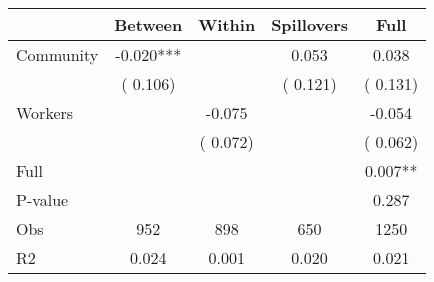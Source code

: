 
\begin{tabular}{l*{4}{c}}\hline&\multicolumn{1}{c}{Between}&\multicolumn{1}{c}{Within}&\multicolumn{1}{c}{Spillovers}&\multicolumn{1}{c}{Full}\\ \hline
 Community             &             -0.020***      &                                               &        0.053 &         0.038                            \\ 
                               &        (       0.106)           &                                       &       (       0.121)     &      (       0.131)                                           \\ 
 Workers       &                                               &       -0.075    &                                &            -0.054                            \\ 
                               &                                               & (       0.072)                  &                                        &      (       0.062)                                           \\ 
\hline                                                                                                                                                                                                                                            
 Full                  &                                               &                                               &                                        &             0.007**                                     \\ 
 P-value               &                                               &                                               &                                        &             0.287                                           \\ 
 Obs                   &               952               &       898                       &       650                &              1250                                               \\ 
 R2                    &                      0.024              &              0.001                      &              0.020               &                     0.021                                              \\ 
\hline \end{tabular}                                                                                                                                                                                                              
